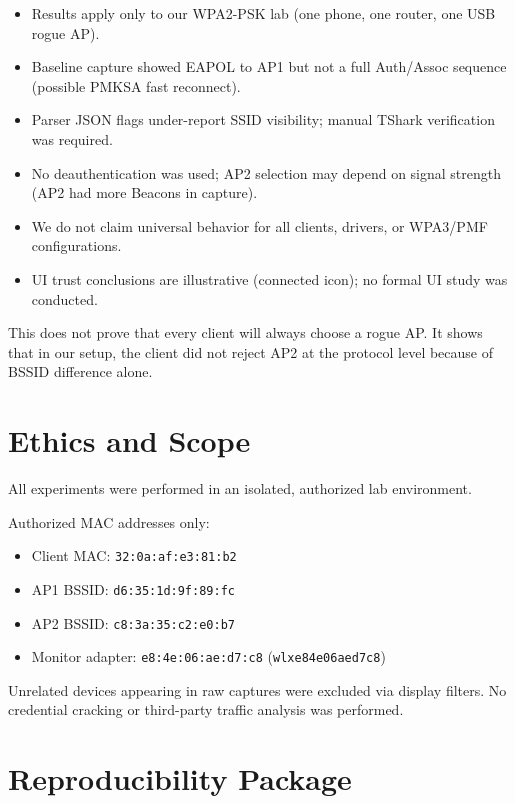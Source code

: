 \documentclass[12pt,a4paper]{article}
\begin{document}
\begin{itemize}
    \item Results apply only to our WPA2-PSK lab (one phone, one router, one USB rogue AP).
    \item Baseline capture showed EAPOL to AP1 but not a full Auth/Assoc sequence (possible PMKSA fast reconnect).
    \item Parser JSON flags under-report SSID visibility; manual TShark verification was required.
    \item No deauthentication was used; AP2 selection may depend on signal strength (AP2 had more Beacons in capture).
    \item We do not claim universal behavior for all clients, drivers, or WPA3/PMF configurations.
    \item UI trust conclusions are illustrative (connected icon); no formal UI study was conducted.
\end{itemize}

This does not prove that every client will always choose a rogue AP. It shows that in our setup, the client did not reject AP2 at the protocol level because of BSSID difference alone.

\section{Ethics and Scope}

All experiments were performed in an isolated, authorized lab environment.

Authorized MAC addresses only:
\begin{itemize}
    \item Client MAC: \texttt{32:0a:af:e3:81:b2}
    \item AP1 BSSID: \texttt{d6:35:1d:9f:89:fc}
    \item AP2 BSSID: \texttt{c8:3a:35:c2:e0:b7}
    \item Monitor adapter: \texttt{e8:4e:06:ae:d7:c8} (\texttt{wlxe84e06aed7c8})
\end{itemize}

Unrelated devices appearing in raw captures were excluded via display filters. No credential cracking or third-party traffic analysis was performed.

\section{Reproducibility Package}
\end{document}
